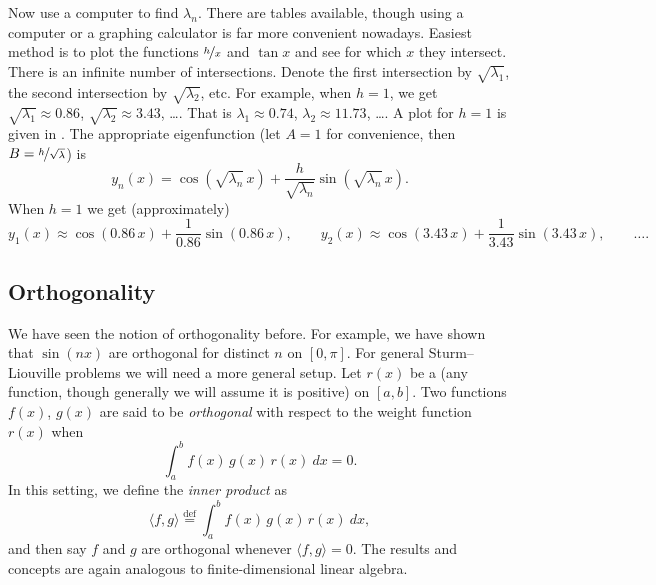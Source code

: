 \begin{example}
Now use a computer to find $\lambda_n$.  There are tables available,
though using a computer or a graphing calculator
is far more convenient nowadays.
Easiest method is to plot the functions 
$\nicefrac{h}{x}$ and $\tan x$ and see for which $x$ they intersect.
There is an infinite number of intersections.  Denote
the first intersection
by $\sqrt{\lambda_1}$,
the second intersection by $\sqrt{\lambda_2}$, etc.
For example, when
$h=1$, we get $\sqrt{\lambda_1} \approx 0.86$, 
$\sqrt{\lambda_2} \approx 3.43$, \ldots.
That is $\lambda_1 \approx 0.74$, $\lambda_2 \approx 11.73$, \ldots.
A plot for $h=1$ is given in .
The appropriate eigenfunction
(let $A = 1$ for convenience, then
$B=\nicefrac{h}{\sqrt{\lambda}}$) is
\begin{equation*}
y_n(x) = \cos ( \sqrt{\lambda_n}\, x ) + \frac{h}{\sqrt{\lambda_n}}
\sin (\sqrt{\lambda_n} \, x ) .
\end{equation*}
When $h=1$ we get (approximately)
\begin{equation*}
y_1(x) \approx \cos (0.86\, x ) + \frac{1}{0.86}
\sin (0.86 \, x ) , \qquad
y_2(x) \approx \cos (3.43\, x ) + \frac{1}{3.43}
\sin (3.43 \, x ) , \qquad \ldots .
\end{equation*}
\begin{myfig}
\capstart
{}
\caption{Plot of $\frac{1}{x}$ and $\tan x$.%
\label{sl:tanx1overxfig}}
\end{myfig}
\end{example}

\subsection{Orthogonality}

We have seen the notion of orthogonality before.  For example,
we have shown that $\sin (nx)$ are orthogonal for distinct $n$ on $[0,\pi]$.
For general Sturm--Liouville problems we will need a more general setup.
Let $r(x)$
be a \emph{} (any function, though generally we will
assume it is positive) on $[a,b]$.  Two functions $f(x)$, $g(x)$
are said to be
\emph{orthogonal} 
with respect to the weight function
$r(x)$ when
\begin{equation*}
\int_a^b f(x) \, g(x) \, r(x) ~dx = 0 .
\end{equation*}
In this setting,
we define the \emph{inner product} as
\begin{equation*}
\langle f , g \rangle \overset{\text{def}}{=} \int_a^b f(x) \, g(x) \, r(x) ~dx ,
\end{equation*}
and then say $f$ and $g$ are orthogonal whenever $\langle f , g \rangle = 0$.
The results and concepts are again analogous to 
finite-dimensional linear algebra.

